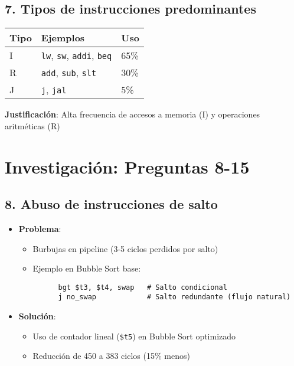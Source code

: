 \documentclass{article}
\begin{document}
\subsection*{7. Tipos de instrucciones predominantes}
\begin{center}
  \begin{tabular}{l|l|l}
    \textbf{Tipo} & \textbf{Ejemplos} & \textbf{Uso} \\
    \hline
    I & \texttt{lw}, \texttt{sw}, \texttt{addi}, \texttt{beq} & 65\% \\
    R & \texttt{add}, \texttt{sub}, \texttt{slt} & 30\% \\
    J & \texttt{j}, \texttt{jal} & 5\% \\
  \end{tabular}
\end{center}

\textbf{Justificación}: Alta frecuencia de accesos a memoria (I) y operaciones aritméticas (R)

\section*{Investigación: Preguntas 8-15}

\subsection*{8. Abuso de instrucciones de salto}
\begin{itemize}
  \item \textbf{Problema}: 
  \begin{itemize}
    \item Burbujas en pipeline (3-5 ciclos perdidos por salto)
    \item Ejemplo en Bubble Sort base:
    \begin{verbatim}
      bgt $t3, $t4, swap   # Salto condicional
      j no_swap            # Salto redundante (flujo natural)
    \end{verbatim}
  \end{itemize}
  
  \item \textbf{Solución}: 
  \begin{itemize}
    \item Uso de contador lineal (\texttt{\$t5}) en Bubble Sort optimizado
    \item Reducción de 450 a 383 ciclos (15\% menos)
  \end{itemize}
\end{itemize}
\end{document}
